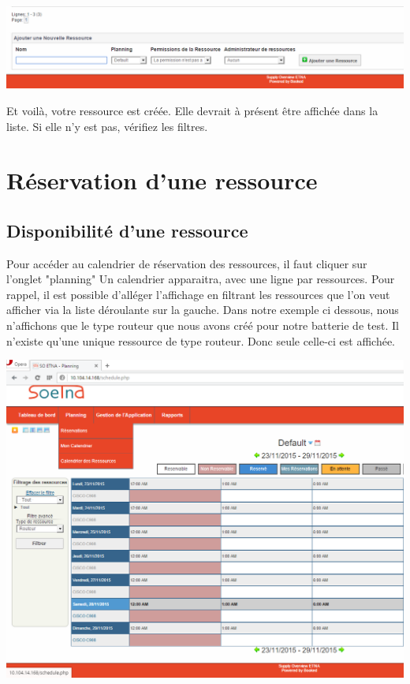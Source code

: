 \documentclass[a4paper,11pt]{article}
\begin{document}
\vspace{1 cm}

\includegraphics[width=15cm]{./res2.PNG}

\vspace{1 cm}

Et voilà, votre ressource est créée. Elle devrait à présent être affichée dans la liste. Si elle n'y est pas, vérifiez les filtres.

\newpage

\section{Réservation d'une ressource}

\subsection{Disponibilité d'une ressource}

Pour accéder au calendrier de réservation des ressources, il faut cliquer sur l'onglet "planning"
Un calendrier apparaitra, avec une ligne par ressources. Pour rappel, il est possible d'alléger l'affichage
en filtrant les ressources que l'on veut afficher via la liste déroulante sur la gauche. Dans notre exemple ci dessous, nous n'affichons que
le type routeur que nous avons créé pour notre batterie de test. Il n'existe qu'une unique ressource de type routeur.
Donc seule celle-ci est affichée.

\vspace{1 cm}

\includegraphics[width=15cm]{./resa1.PNG}
\end{document}
